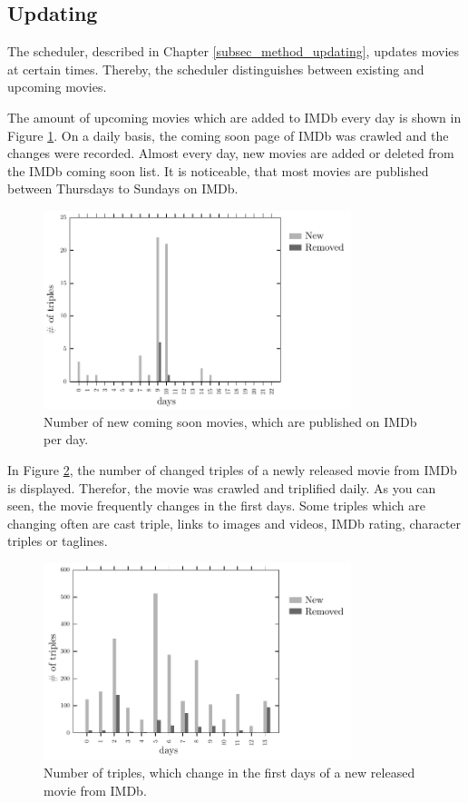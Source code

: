 \subsection{Updating}
\label{subsec_evaluation_updating}

The scheduler, described in Chapter \ref{subsec_method_updating}, updates movies at certain times.
Thereby, the scheduler distinguishes between existing and upcoming movies.

The amount of upcoming movies which are added to IMDb every day is shown in Figure \ref{fig_coming_soon_movie}.
On a daily basis, the coming soon page of IMDb was crawled and the changes were recorded.
Almost every day, new movies are added or deleted from the IMDb coming soon list.
It is noticeable, that most movies are published between Thursdays to Sundays on IMDb.

\begin{figure}[h!]
  \begin{center}
  \includegraphics[width=0.8\textwidth]{images/updating_1.pdf}
  \end{center}
  \caption{Number of new coming soon movies, which are published on IMDb per day.}
  \label{fig_coming_soon_movie}
\end{figure}

In Figure \ref{fig_new_movie}, the number of changed triples of a newly released movie from IMDb is displayed.
Therefor, the movie was crawled and triplified daily.
As you can seen, the movie frequently changes in the first days.
Some triples which are changing often are cast triple, links to images and videos, IMDb rating, character triples or taglines.

\begin{figure}[h!]
  \begin{center}
  \includegraphics[width=0.8\textwidth]{images/updating_2.pdf}
  \end{center}
  \caption{Number of triples, which change in the first days of a new released movie from IMDb.}
  \label{fig_new_movie}
\end{figure}